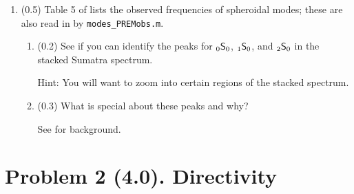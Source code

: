 \documentclass[11pt,titlepage,fleqn]{article}
\newcommand{\snl}[2]{\mbox{$_{#1}\ssS_{#2}$}}
\begin{document}
\begin{enumerate}

\item (0.5) Table 5 of \citet{PREM} lists the observed frequencies of spheroidal modes; these are also read in by \verb+modes_PREMobs.m+.
%
\begin{enumerate}
\item (0.2) See if you can identify the peaks for \snl{0}{0}, \snl{1}{0}, and \snl{2}{0} in the stacked Sumatra spectrum.

Hint: You will want to zoom into certain regions of the stacked spectrum.

\item (0.3) What is special about these peaks and why?

See \citet[][p. 106]{SteinWysession} for background.
\end{enumerate}

\end{enumerate}


\section*{Problem 2 (4.0). Directivity}
\end{document}
